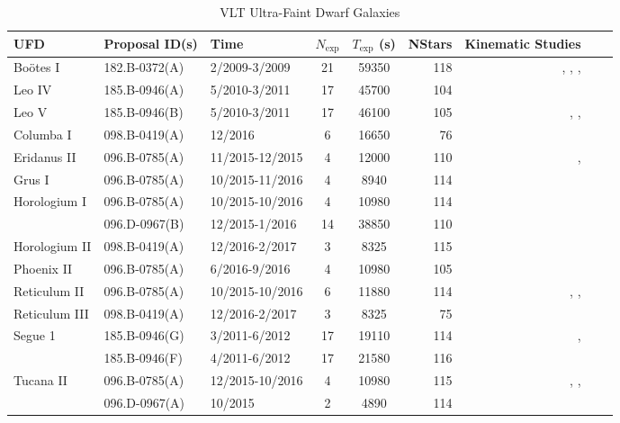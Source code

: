 \begin{table*}[htp!]
\centering
\tiny
\caption{VLT Ultra-Faint Dwarf Galaxies} \label{tab:table_ufd_list} 
\centering
\begin{tabular}{lllccrrrl}
\hline
\hline
 UFD & Proposal ID(s) & Time  & $N_\mathrm{exp}$ & $T_\mathrm{exp}$ (s) & NStars & Kinematic Studies \\
\hline
Bo{\"o}tes I & 182.B-0372(A) & 2/2009-3/2009 & 21 & 59350 & 118  & \citet{mun2006}, \citet{Mar2007}, \citet{lai2011}, \citet{kop2011}\\
Leo IV & 185.B-0946(A) & 5/2010-3/2011 &  17 & 45700 & 104 & \citet{sim2007}\\
Leo V & 185.B-0946(B) & 5/2010-3/2011 &  17 & 46100 & 105 & \citet{wal2009}, \citet{col2017}, \citet{mut2020} \\
\hline
Columba I & 098.B-0419(A) & 12/2016 & 6 & 16650 & 76 & \citet{fri2019} \\
Eridanus II & 096.B-0785(A) & 11/2015-12/2015 & 4 & 12000 & 110 & \citet{li2017}, \citet{zou2020}\\
Grus I & 096.B-0785(A) & 10/2015-11/2016 & 4 & 8940 & 114 & \citet{wal2016}\\
Horologium I & 096.B-0785(A) & 10/2015-10/2016 & 4 & 10980 & 114 & \citet{kop2015}\\
& 096.D-0967(B) & 12/2015-1/2016 & 14 & 38850 & 110 & \\
Horologium II & 098.B-0419(A) & 12/2016-2/2017 & 3 & 8325 & 115 & \citet{fri2019}\\
Phoenix II &096.B-0785(A) & 6/2016-9/2016 & 4 & 10980 & 105 & \citet{fri2019}\\
Reticulum II & 096.B-0785(A) & 10/2015-10/2016 & 6 & 11880 & 114 & \citet{wal2015}, \citet{sim2015}, \citet{kop2015} \\
Reticulum III & 098.B-0419(A) & 12/2016-2/2017 & 3 & 8325 & 75 & \citet{fri2019}\\ 
Segue 1 & 185.B-0946(G) & 3/2011-6/2012 & 17 & 19110 & 114 & \citet{sim2011}, \citet{geh2009} \\
& 185.B-0946(F) & 4/2011-6/2012 & 17 & 21580 & 116 & \\
Tucana II & 096.B-0785(A) & 12/2015-10/2016  & 4 & 10980 & 115 & \citet{wal2016}, \citet{chi2018}, \citet{chi2020} \\
& 096.D-0967(A) & 10/2015 & 2 & 4890 & 114 & \\
\hline
\end{tabular}
\end{table*}